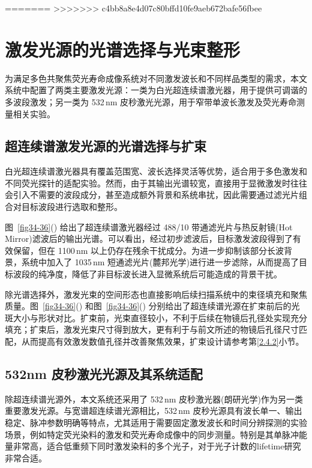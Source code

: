 =======
>>>>>>> c4bb8a8e4d07c80bffd10fe9aeb672bafe56fbee

\section{激发光源的光谱选择与光束整形}\label{3.2}

为满足多色共聚焦荧光寿命成像系统对不同激发波长和不同样品类型的需求，本文系统中配置了两类主要激发光源：一类为白光超连续谱激光器，用于提供可调谐的多波段激发；另一类为 532\,nm 皮秒激光光源，用于窄带单波长激发及荧光寿命测量相关实验。

\subsection{超连续谱激发光源的光谱选择与扩束}\label{3.2.1}

白光超连续谱激光器具有覆盖范围宽、波长选择灵活等优势，适合用于多色激发和不同荧光探针的适配实验。然而，由于其输出光谱较宽，直接用于显微激发时往往会引入不需要的波段成分，甚至造成额外背景和系统串扰，因此需要通过滤光片组合对目标波段进行选取和整形。


图~\ref{fig34-36}() 给出了超连续谱激光器经过 488/10 带通滤光片与热反射镜(Hot Mirror)滤波后的输出光谱。可以看出，经过初步滤波后，目标激发波段得到了有效保留，但在 1100\,nm 以上仍存在残余干扰成分。为进一步抑制该部分长波背景，系统中加入了 1035\,nm 短通滤光片(麓邦光学)进行进一步滤除，从而提高了目标波段的纯净度，降低了非目标波长进入显微系统后可能造成的背景干扰。

除光谱选择外，激发光束的空间形态也直接影响后续扫描系统中的束径填充和聚焦质量。图~\ref{fig34-36}() 和图~\ref{fig34-36}() 分别给出了超连续谱光源在扩束前后的光斑大小与形状对比。扩束前，光束直径较小，不利于后续在物镜后孔径处实现充分填充；扩束后，激发光束尺寸得到放大，更有利于与前文所述的物镜后孔径尺寸匹配，从而提高有效激发数值孔径并改善聚焦效果，扩束设计请参考第\ref{2.4.2}小节。




\subsection{532nm 皮秒激光光源及其系统适配}\label{3.2.2}

除超连续谱光源外，本文系统还采用了 532\,nm 皮秒激光器(朗研光学)作为另一类重要激发光源。与宽谱超连续谱光源相比，532\,nm 皮秒光源具有波长单一、输出稳定、脉冲参数明确等特点，尤其适用于需要固定激发波长和时间分辨探测的实验场景，例如特定荧光染料的激发和荧光寿命成像中的同步测量。特别是其单脉冲能量非常高，适合低重频下同时激发染料的多个光子，对于光子计数的lifetime研究非常合适。

